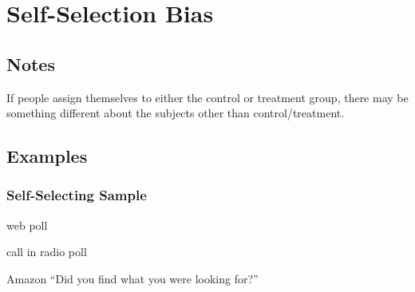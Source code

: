 \documentclass[landscape]{exam}
\begin{document}
  \section{Self-Selection Bias}

  \subsection{Notes}
  If people assign themselves to either the control or treatment group, there
  may be something different about the subjects other than control/treatment.
  
  \subsection{Examples}

  \subsubsection{Self-Selecting Sample}
  \begin{itemize*}
    \item web poll
    \item call in radio poll
    \item Amazon ``Did you find what you were looking for?''
  \end{itemize*}



\end{document}

